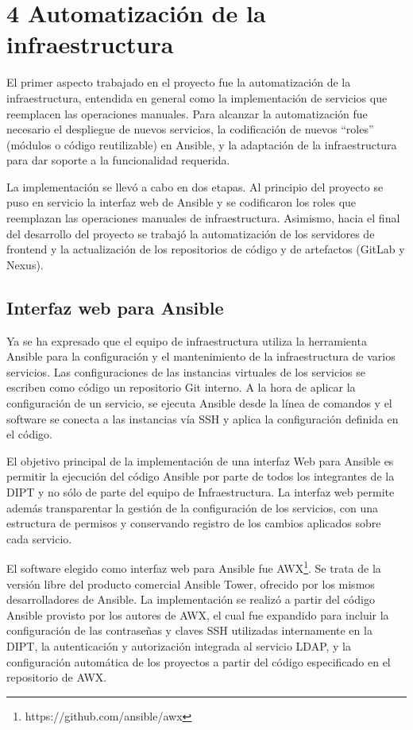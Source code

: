 \chapter{4 Automatización de la infraestructura}

El primer aspecto trabajado en el proyecto fue la automatización de la
infraestructura, entendida en general como la implementación de
servicios que reemplacen las operaciones manuales. Para alcanzar la
automatización fue necesario el despliegue de nuevos servicios, la
codificación de nuevos ``roles'' (módulos o código reutilizable) en
Ansible, y la adaptación de la infraestructura para dar soporte a la
funcionalidad requerida.

La implementación se llevó a cabo en dos etapas. Al principio del
proyecto se puso en servicio la interfaz web de Ansible y se
codificaron los roles que reemplazan las operaciones manuales de
infraestructura. Asimismo, hacia el final del desarrollo del proyecto
se trabajó la automatización de los servidores de frontend y la
actualización de los repositorios de código y de artefactos (GitLab y
Nexus).

\section{Interfaz web para Ansible}

Ya se ha expresado que el equipo de infraestructura utiliza la
herramienta Ansible para la configuración y el mantenimiento de la
infraestructura de varios servicios. Las configuraciones de las
instancias virtuales de los servicios se escriben como código un
repositorio Git interno. A la hora de aplicar la configuración de un
servicio, se ejecuta Ansible desde la línea de comandos y el software
se conecta a las instancias vía SSH y aplica la configuración definida
en el código.

El objetivo principal de la implementación de una interfaz Web para
Ansible es permitir la ejecución del código Ansible por parte de todos
los integrantes de la DIPT y no sólo de parte del equipo de
Infraestructura. La interfaz web permite además transparentar la
gestión de la configuración de los servicios, con una estructura de
permisos y conservando registro de los cambios aplicados sobre cada
servicio.

El software elegido como interfaz web para Ansible fue AWX\footnote{
  https://github.com/ansible/awx}. Se trata de la versión libre del
producto comercial Ansible Tower, ofrecido por los mismos
desarrolladores de Ansible. La implementación se realizó a partir del
código Ansible provisto por los autores de AWX, el cual fue expandido
para incluir la configuración de las contraseñas y claves SSH
utilizadas internamente en la DIPT, la autenticación y autorización
integrada al servicio LDAP, y la configuración automática de los
proyectos a partir del código especificado en el repositorio de AWX.

